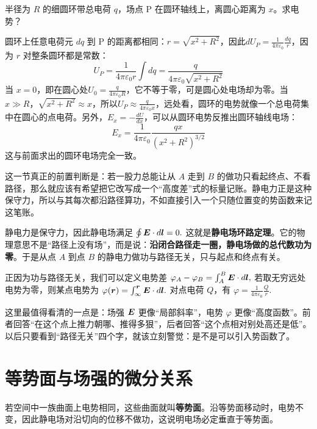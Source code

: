 \documentclass[lang=cn,11pt]{elegantbook}
\newcommand{\bridge}[1]{\begin{note}#1\end{note}}
\begin{document}
\begin{exercise}
半径为 \(R\) 的细圆环带总电荷 \(q\)，场点 P 在圆环轴线上，离圆心距离为 \(x\)。求电势？
\end{exercise}
\begin{solution}
圆环上任意电荷元 \(dq\) 到 P 的距离都相同：\(r=\sqrt{x^2+R^2}\)，因此\(dU_P=
\frac{1}{4\pi\varepsilon_0}\frac{dq}{r}\)，因为 \(r\) 对整条圆环都是常数：
\[U_P=\frac{1}{4\pi\varepsilon_0r}\int dq=\frac{q}{4\pi\varepsilon_0\sqrt{x^2+R^2}}\]
当 \(x=0\)，即在圆心处\(U_0=\frac{q}{4\pi\varepsilon_0R}\)，它不等于零，可是圆心处电场却为零。当 \(x\gg R\)，\(\sqrt{x^2+R^2}\approx x\)，所以\(U_P\approx
\frac{q}{4\pi\varepsilon_0x}\)，远处看，圆环的电势就像一个总电荷集中在圆心的点电荷。另外，\(E_x=-\frac{dU}{dx}\)，可以从圆环电势反推出圆环轴线电场：
\[
E_x=
\frac{1}{4\pi\varepsilon_0}
\frac{qx}{(x^2+R^2)^{3/2}}
\]这与前面求出的圆环电场完全一致。
\end{solution}





这一节真正的前置判断是：若一股力总能让从 \(A\) 走到 \(B\) 的做功只看起终点、不看路径，那么就应该有希望把它改写成一个“高度差”式的标量记账。静电力正是这种保守力，所以与其每次都沿路径算功，不如直接引入一个只随位置变的势函数来记这笔账。

静电力是保守力，因此静电场满足
 \(\oint \vb*{E}\cdot d\vb*{l}=0.\) 
这就是\textbf{静电场环路定理}。它的物理意思不是“路径上没有场”，而是说：\textbf{沿闭合路径走一圈，静电场做的总代数功为零}。于是从点 \(A\) 到点 \(B\) 的静电力做功与路径无关，只与起点和终点有关。

正因为功与路径无关，我们可以定义电势差
 \(\varphi_A-\varphi_B =\int_A^B \vb*{E}\cdot d\vb*{l},\) 
若取无穷远处电势为零，则某点电势为
 \(\varphi(\vb*{r})=\int_{\infty}^{\vb*{r}} \vb*{E}\cdot d\vb*{l}.\) 
对点电荷 \(Q\)，有
 \(\varphi=\frac{1}{4\pi\varepsilon_0}\frac{Q}{r}.\) 

\bridge{这里最值得看清的一点是：场强 \(\vb*{E}\) 更像“局部斜率”，电势 \(\varphi\) 更像“高度函数”。前者回答“在这个点上推力朝哪、推得多狠”，后者回答“这个点相对别处高还是低”。以后只要看到“路径无关”四个字，就该立刻警觉：是不是可以引入势函数了。}

\section{等势面与场强的微分关系}

若空间中一族曲面上电势相同，这些曲面就叫\textbf{等势面}。沿等势面移动时，电势不变，因此静电场对沿切向的位移不做功，这说明电场必定垂直于等势面。
\end{document}
